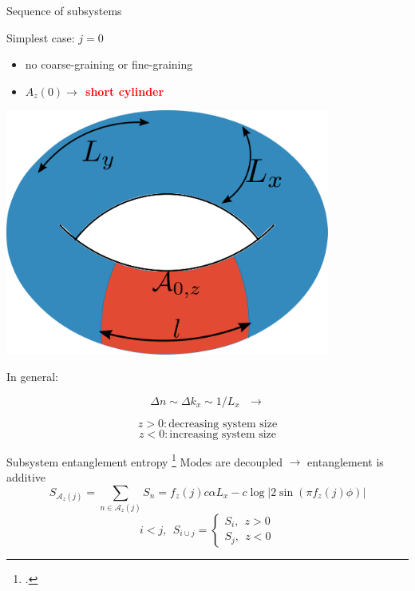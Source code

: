 \documentclass[12pt,aspectratio=169]{beamer}
\newcommand{\focus}[1]{\textcolor{red}{\bf{#1}}}
\begin{document}
\begin{frame}{Sequence of subsystems}
\hspace*{\fill}
\begin{minipage}{0.5\textwidth}
Simplest case: \(j=0\)\\[5pt]
\begin{itemize}
	\item no coarse-graining or fine-graining\\[20pt]
	\item \(A_z(0) \longrightarrow ~ ~\)\focus{short cylinder}
\end{itemize}
\end{minipage}
\hspace*{\fill}
\begin{minipage}{0.4\textwidth}
	\includegraphics[width=0.8\textwidth]{figures/A_m1.pdf}
\end{minipage}

\vspace*{\fill}
\centering
In general:

\begin{minipage}{0.33\textwidth}
	\[\Delta n \sim \Delta k_x \sim 1/L_x ~ ~ ~\longrightarrow \]
\end{minipage}
\begin{minipage}{0.33\textwidth}
	\[ z > 0: \text{decreasing system size}\]
	\[ z < 0: \text{increasing system size}\]
\end{minipage}
\end{frame}

\begin{frame}{Subsystem entanglement entropy}
\footcite{Calabrese_2004,Casini_2005,Arias_2015,Chen_2017,Murciano_2020}
Modes are decoupled \(\longrightarrow\) entanglement is additive
\vspace*{\fill}
\[S_{\mathcal{A}_z(j)} = \sum_{n \in \mathcal{A}_z(j)} S_n = f_z(j) c \alpha L_x - c \log \big|2\sin\left(\pi f_z(j)\phi\right)\big|\]
\[i < j, ~ ~ S_{i\cup j} =
	\begin{cases}
	S_{i}, ~ ~ z > 0\\
	S_{j}, ~ ~ z < 0
	\end{cases}
\]
\end{frame}
	
\end{document}
